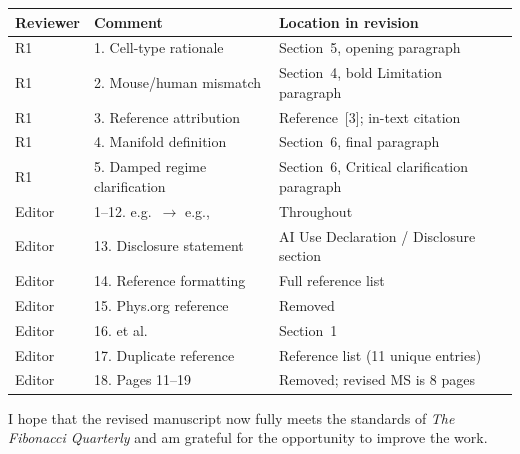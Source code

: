 \documentclass[12pt,a4paper]{article}
\begin{document}
\medskip
\begin{center}
\small
\begin{tabular}{lll}
\hline
\textbf{Reviewer} & \textbf{Comment} & \textbf{Location in revision} \\
\hline
R1 & 1. Cell-type rationale & Section~5, opening paragraph \\
R1 & 2. Mouse/human mismatch & Section~4, bold Limitation paragraph \\
R1 & 3. Reference attribution & Reference~[3]; in-text citation \\
R1 & 4. Manifold definition & Section~6, final paragraph \\
R1 & 5. Damped regime clarification & Section~6, Critical clarification paragraph \\
\hline
Editor & 1--12. e.g.\ $\to$ e.g., & Throughout \\
Editor & 13. Disclosure statement & AI Use Declaration / Disclosure section \\
Editor & 14. Reference formatting & Full reference list \\
Editor & 15. Phys.org reference & Removed \\
Editor & 16. et al. & Section~1 \\
Editor & 17. Duplicate reference & Reference list (11 unique entries) \\
Editor & 18. Pages 11--19 & Removed; revised MS is 8 pages \\
\hline
\end{tabular}
\end{center}

\bigskip
I hope that the revised manuscript now fully meets the standards of
\textit{The Fibonacci Quarterly} and am grateful for the opportunity
to improve the work.
\end{document}
